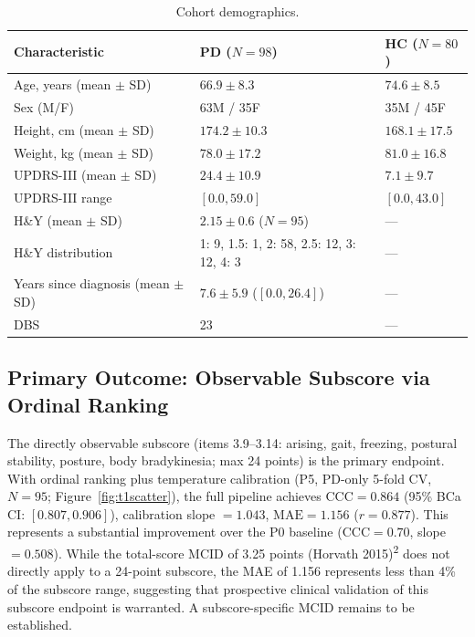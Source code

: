 \documentclass[11pt,a4paper]{article}
\begin{document}
\begin{table}[H]
\centering
\caption{Cohort demographics.}
\label{tab:cohort}
\begin{tabular}{lll}
\toprule
\textbf{Characteristic} & \textbf{PD ($N=98$)} & \textbf{HC ($N=80$)} \\
\midrule
Age, years (mean $\pm$ SD)              & $66.9 \pm 8.3$           & $74.6 \pm 8.5$ \\
Sex (M/F)                               & 63M / 35F                & 35M / 45F \\
Height, cm (mean $\pm$ SD)              & $174.2 \pm 10.3$         & $168.1 \pm 17.5$ \\
Weight, kg (mean $\pm$ SD)              & $78.0 \pm 17.2$          & $81.0 \pm 16.8$ \\
UPDRS-III (mean $\pm$ SD)               & $24.4 \pm 10.9$          & $7.1 \pm 9.7$ \\
UPDRS-III range                         & $[0.0, 59.0]$            & $[0.0, 43.0]$ \\
H\&Y (mean $\pm$ SD)                    & $2.15 \pm 0.6$ ($N=95$)  & --- \\
H\&Y distribution                       & 1: 9, 1.5: 1, 2: 58, 2.5: 12, 3: 12, 4: 3 & --- \\
Years since diagnosis (mean $\pm$ SD)   & $7.6 \pm 5.9$ ($[0.0, 26.4]$) & --- \\
DBS                                     & 23                       & --- \\
\bottomrule
\end{tabular}
\end{table}

\subsection{Primary Outcome: Observable Subscore via Ordinal Ranking}

The directly observable subscore (items 3.9--3.14: arising, gait, freezing, postural stability, posture, body bradykinesia; max 24 points) is the primary endpoint. With ordinal ranking plus temperature calibration (P5, PD-only 5-fold CV, $N=95$; Figure~\ref{fig:t1scatter}), the full pipeline achieves $\mathrm{CCC}=0.864$ (95\% BCa CI: $[0.807, 0.906]$), calibration slope $=1.043$, $\mathrm{MAE}=1.156$ ($r=0.877$). This represents a substantial improvement over the P0 baseline ($\mathrm{CCC}=0.70$, slope $=0.508$). While the total-score MCID of 3.25 points (Horvath 2015)\textsuperscript{2} does not directly apply to a 24-point subscore, the MAE of 1.156 represents less than 4\% of the subscore range, suggesting that prospective clinical validation of this subscore endpoint is warranted. A subscore-specific MCID remains to be established.
\end{document}
